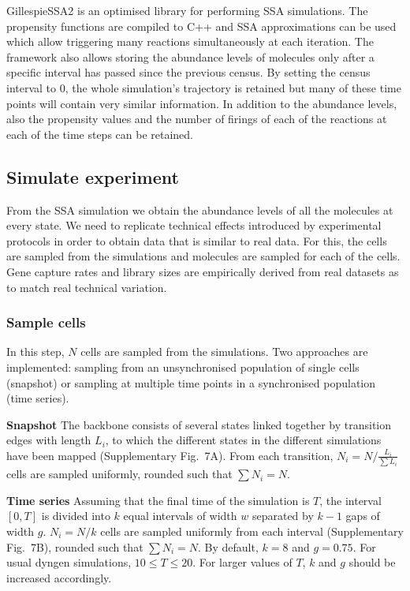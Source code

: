 \documentclass[10pt, a4paper]{article}
\begin{document}
GillespieSSA2 is an optimised library for performing SSA simulations.
The propensity functions are compiled to C++ and SSA approximations can
be used which allow triggering many reactions simultaneously at each
iteration. The framework also allows storing the abundance levels of
molecules only after a specific interval has passed since the previous
census. By setting the census interval to 0, the whole simulation's
trajectory is retained but many of these time points will contain very
similar information. In addition to the abundance levels, also the
propensity values and the number of firings of each of the reactions at
each of the time steps can be retained.

\subsection{Simulate experiment}\label{sec:dyngen-experiment}

From the SSA simulation we obtain the abundance levels of all the
molecules at every state. We need to replicate technical effects
introduced by experimental protocols in order to obtain data that is
similar to real data. For this, the cells are sampled from the
simulations and molecules are sampled for each of the cells. Gene
capture rates and library sizes are empirically derived from real
datasets as to match real technical variation.

\subsubsection{Sample cells}\label{sample-cells}

In this step, \(N\) cells are sampled from the simulations. Two
approaches are implemented: sampling from an unsynchronised population
of single cells (snapshot) or sampling at multiple time points in a
synchronised population (time series).

\textbf{Snapshot} The backbone consists of several states linked
together by transition edges with length \(L_i\), to which the different
states in the different simulations have been mapped (Supplementary
Fig.~7A). From each transition, \(N_i = N / \frac{L_i}{\sum L_i}\) cells
are sampled uniformly, rounded such that \(\sum N_i = N\).

\textbf{Time series} Assuming that the final time of the simulation is
\(T\), the interval \([0, T]\) is divided into \(k\) equal intervals of
width \(w\) separated by \(k-1\) gaps of width \(g\). \(N_i = N / k\)
cells are sampled uniformly from each interval (Supplementary Fig.~7B),
rounded such that \(\sum N_i = N\). By default, \(k = 8\) and
\(g = 0.75\). For usual dyngen simulations, \(10 \leq T \leq 20\). For
larger values of \(T\), \(k\) and \(g\) should be increased accordingly.
\end{document}
